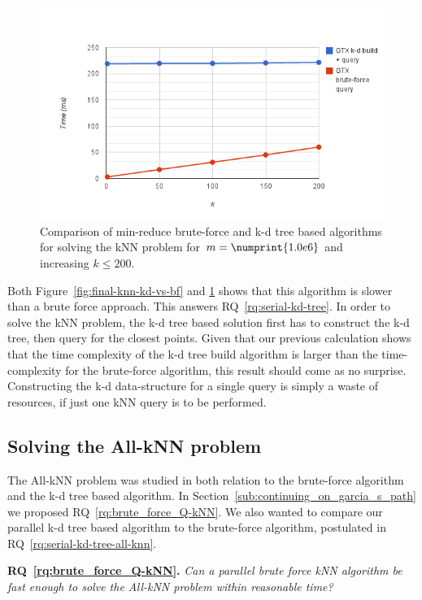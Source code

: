 \begin{figure}[ht!]
    \centering
    \includegraphics[width=120mm]{../gfx/final-var-knn-kd-vs-bf.png}
    \caption{Comparison of min-reduce brute-force and k-d tree based algorithms for solving the kNN problem for $m=\numprint{1.0e6}$ and increasing $k\le200$.}
    \label{fig:final-var-knn-kd-vs-bf}
\end{figure}

Both Figure~\ref{fig:final-knn-kd-vs-bf} and \ref{fig:final-var-knn-kd-vs-bf} shows that this algorithm is slower than a brute force approach. This answers RQ~\ref{rq:serial-kd-tree}. In order to solve the kNN problem, the k-d tree based solution first has to construct the k-d tree, then query for the closest points. Given that our previous calculation shows that the time complexity of the k-d tree build algorithm is larger than the time-complexity for the brute-force algorithm, this result should come as no surprise. Constructing the k-d data-structure for a single query is simply a waste of resources, if just one kNN query is to be performed.

\subsection{Solving the All-kNN problem} %
\label{sub:solving_the_all_knn_problem}

The All-kNN problem was studied in both relation to the brute-force algorithm and the k-d tree based algorithm. In Section~\ref{sub:continuing_on_garcia_s_path} we proposed RQ~\ref{rq:brute_force_Q-kNN}. We also wanted to compare our parallel k-d tree based algorithm to the brute-force algorithm, postulated in RQ~\ref{rq:serial-kd-tree-all-knn}.

\textbf{RQ~\ref{rq:brute_force_Q-kNN}.} \emph{Can a parallel brute force kNN algorithm be fast enough to solve the All-kNN problem within reasonable time?}

